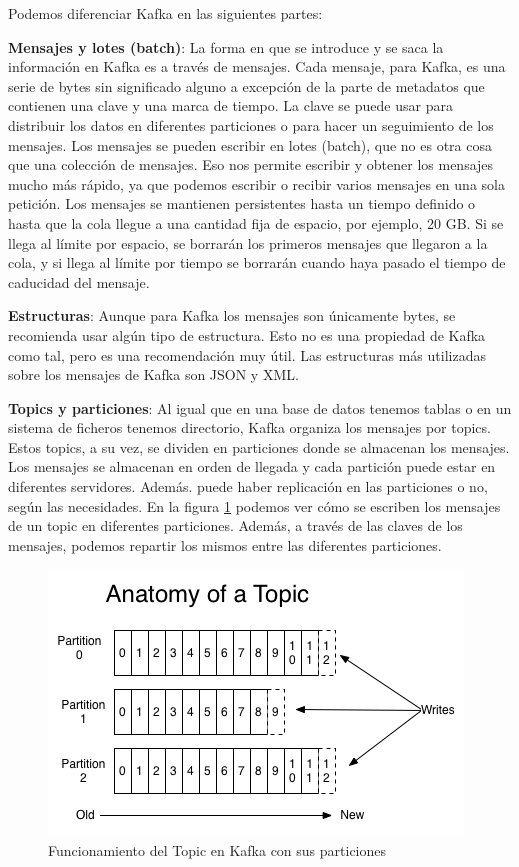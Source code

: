Podemos diferenciar Kafka en las siguientes partes:\par

\textbf{Mensajes y lotes (batch)}: La forma en que se introduce y se saca la información en Kafka es a través de mensajes. Cada mensaje, para Kafka, es una serie de bytes sin significado alguno a excepción de la parte de metadatos que contienen una clave y una marca de tiempo. La clave se puede usar para distribuir los datos en diferentes particiones o para hacer un seguimiento de los mensajes. Los mensajes se pueden escribir en lotes (batch), que no es otra cosa que una colección de mensajes. Eso nos permite escribir y obtener los mensajes mucho más rápido, ya que podemos escribir o recibir varios mensajes en una sola petición. Los mensajes se mantienen persistentes hasta un tiempo definido o hasta que la cola llegue a una cantidad fija de espacio, por ejemplo, 20 GB. Si se llega al límite por espacio, se borrarán los primeros mensajes que llegaron a la cola, y si llega al límite por tiempo se borrarán cuando haya pasado el tiempo de caducidad del mensaje.\par

\textbf{Estructuras}: Aunque para Kafka los mensajes son únicamente bytes, se recomienda usar algún tipo de estructura. Esto no es una propiedad de Kafka como tal, pero es una recomendación muy útil. Las estructuras más utilizadas sobre los mensajes de Kafka son JSON y XML.\par

\textbf{Topics y particiones}: Al igual que en una base de datos tenemos tablas o en un sistema de ficheros tenemos directorio, Kafka organiza los mensajes por topics. Estos topics, a su vez, se dividen en particiones donde se almacenan los mensajes. Los mensajes se almacenan en orden de llegada y cada partición puede estar en diferentes servidores. Además. puede haber replicación en las particiones o no, según las necesidades. En la figura \ref{Kfk-img-1} \cite{Kfk-2} podemos ver cómo se escriben los mensajes de un topic en diferentes particiones. Además, a través de las claves de los mensajes, podemos repartir los mismos entre las diferentes particiones.\par


\begin{figure}[htp]
\centering
\includegraphics[scale=0.75]{Imagenes/kafka1.png}
\caption{Funcionamiento del Topic en Kafka con sus particiones}
\label{Kfk-img-1}
\end{figure}

